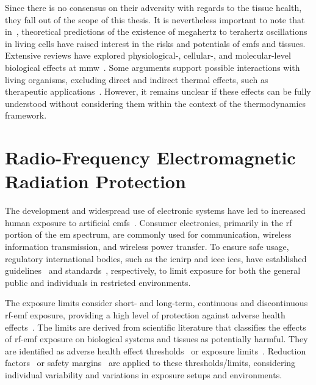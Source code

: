 Since there is no consensus on their adversity with regards to the tissue health, they fall out of the scope of this thesis.
It is nevertheless important to note that in~\cite{Fröhlich1968Long}, theoretical predictions of the existence of megahertz to terahertz oscillations in living cells have raised interest in the risks and potentials of \gls{emf}s and tissues.
Extensive reviews have explored physiological-, cellular-, and molecular-level biological effects at \gls{mmw}~\cite{Pakhomov1998Current,Zhadobov2011Millimeter}.
Some arguments support possible interactions with living organisms, excluding direct and indirect thermal effects, such as therapeutic applications~\cite{Ziskin2006Physiological}.
However, it remains unclear if these effects can be fully understood without considering them within the context of the thermodynamics framework.

\section{Radio-Frequency Electromagnetic Radiation Protection}
The development and widespread use of electronic systems have led to increased human exposure to artificial \gls{emf}s~\cite{Hirata2021Assessment}.
Consumer electronics, primarily in the \gls{rf} portion of the \gls{em} spectrum, are commonly used for communication, wireless information transmission, and wireless power transfer.
To ensure safe usage, regulatory international bodies, such as the \gls{icnirp} and \gls{ieee} \gls{ices}, have established guidelines~\cite{ICNIRP2020Guidelines} and standards~\cite{IEEE2019Standard}, respectively, to limit exposure for both the general public and individuals in restricted environments.

The exposure limits consider short- and long-term, continuous and discontinuous \gls{rf}-\gls{emf} exposure, providing a high level of protection against adverse health effects~\cite{ICNIRP2020Guidelines,IEEE2019Standard}.
The limits are derived from scientific literature that classifies the effects of \gls{rf}-\gls{emf} exposure on biological systems and tissues as potentially harmful.
They are identified as adverse health effect thresholds~\cite{ICNIRP2020Guidelines} or exposure limits~\cite{IEEE2019Standard}.
Reduction factors~\cite{ICNIRP2020Guidelines} or safety margins~\cite{IEEE2019Standard} are applied to these thresholds/limits, considering individual variability and variations in exposure setups and environments.

